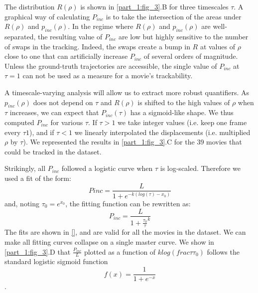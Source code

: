     The distribution $R(\rho)$ is shown in \ref{part_1:fig_3}.B for three timescales $\tau$. A graphical way of calculating $P_{inc}$ is to take the intersection of the areas under $R(\rho)$ and $p_{inc}(\rho)$. In the regime where $R(\rho)$ and $p_{inc}(\rho)$ are well-separated, the resulting value of $P_{inc}$ are low but highly sensitive to the number of swaps in the tracking. Indeed, the swaps create a bump in $R$  at values of $\rho$ close to one that can artificially increase $P_{inc}$ of several orders of magnitude. Unless the ground-truth trajectories are accessible, the single value of $P_{inc}$ at $\tau=1$ can not be used as a measure for a movie's trackability.

    A timescale-varying analysis will allow us to extract more robust quantifiers. As $p_{inc}(\rho)$ does not depend on $\tau$ and $R(\rho)$ is shifted to the high values of $\rho$ when $\tau$ increases, we can expect that $P_{inc}(\tau)$ has a sigmoid-like shape. We thus computed $P_{inc}$ for various $\tau$. If $\tau>1$ we take integer values (i.e. keep one frame every $\tau1$), and if $\tau<1$ we linearly interpolated the displacements (i.e. multiplied $\rho$ by $\tau$). We represented the results in \ref{part_1:fig_3}.C for the 39 movies that could be tracked in the dataset.

    Strikingly, all $P_{inc}$ followed a logistic curve when $\tau$ is log-scaled. Therefore we used a fit of the form:
    $$Pinc=\frac{L}{1 + e^{-k(log(\tau)-x_0)}}$$
    and, noting $\tau_0=e^{x_0}$, the fitting function can be rewritten as:
    $$P_{inc}=\frac{L}{1 + \frac{\tau_0}{\tau}^k}$$
    The fits are shown in \ref{}, and are valid for all the movies in the dataset. We can make all fitting curves collapse on a single master curve. We show in \ref{part_1:fig_3}.D that $\frac{P_{inc}}{L}$ plotted as a function of $klog(frac{\tau}{\tau_0})$ follows the standard logistic sigmoid function $$f(x) =\frac{1}{1+e^{-x}}$$.

